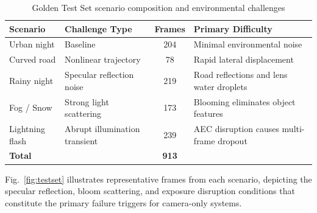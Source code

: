 \documentclass[pdflatex,sn-mathphys-num]{sn-jnl}%
\theoremstyle{thmstyleone}%
\theoremstyle{thmstyletwo}%
\theoremstyle{thmstylethree}%
\begin{document}
\begin{table}[t]
\centering
\caption{Golden Test Set scenario composition and environmental
         challenges}
\label{tab:testset}
%
    \begin{tabular}{llcl}
    \hline
    \textbf{Scenario} & \textbf{Challenge Type}
      & \textbf{Frames} & \textbf{Primary Difficulty} \\
    \hline
    Urban night      & Baseline                      & 204
      & Minimal environmental noise \\
    Curved road      & Nonlinear trajectory          & 78
      & Rapid lateral displacement \\
    Rainy night      & Specular reflection noise     & 219
      & Road reflections and lens water droplets \\
    Fog / Snow       & Strong light scattering       & 173
      & Blooming eliminates object features \\
    Lightning flash  & Abrupt illumination transient & 239
      & AEC disruption causes multi-frame dropout \\
    \hline
    \textbf{Total}   &                               & \textbf{913} & \\
    \hline
    \end{tabular}%
\end{table}

Fig.~\ref{fig:testset} illustrates representative frames from each
scenario, depicting the specular reflection, bloom scattering, and
exposure disruption conditions that constitute the primary failure
triggers for camera-only systems.
\end{document}
